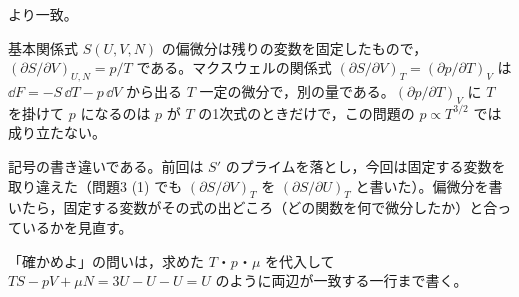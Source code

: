 より一致。
\item 基本関係式 $S(U,V,N)$ の偏微分は残りの変数を固定したもので，$(\partial S/\partial V)_{U,N}=p/T$ である。マクスウェルの関係式 $(\partial S/\partial V)_{T}=(\partial p/\partial T)_{V}$ は $\dd F=-S\,\dd T-p\,\dd V$ から出る $T$ 一定の微分で，別の量である。$(\partial p/\partial T)_{V}$ に $T$ を掛けて $p$ になるのは $p$ が $T$ の1次式のときだけで，この問題の $p\propto T^{3/2}$ では成り立たない。
\item {} 記号の書き違いである。前回は $S'$ のプライムを落とし，今回は固定する変数を取り違えた（問題3 (1) でも $(\partial S/\partial V)_{T}$ を $(\partial S/\partial U)_{T}$ と書いた）。偏微分を書いたら，固定する変数がその式の出どころ（どの関数を何で微分したか）と合っているかを見直す。
\item 「確かめよ」の問いは，求めた $T$・$p$・$\mu$ を代入して $TS-pV+\mu N=3U-U-U=U$ のように両辺が一致する一行まで書く。
